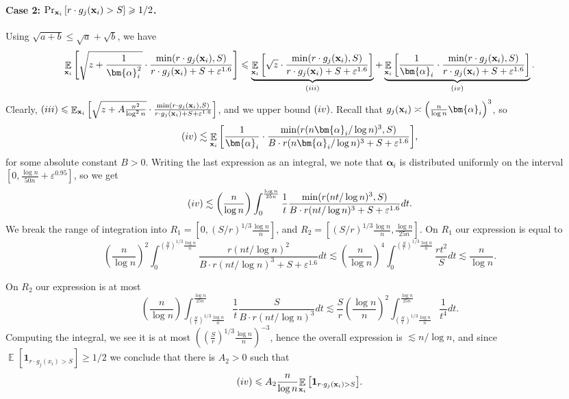 \documentclass[10pt,a4paper]{article}
\newcommand{\mathbbm}[1]{\mathbf{#1}}
\newcommand\Prob[2]{{\Pr_{#1}\left[ {#2} \right]}}
\newcommand\Expect[2]{{\mathop{\mathbb{E}}_{#1}\left[ {#2} \right]}}
\newcommand\eps{\varepsilon}
\renewcommand\geq{\geqslant}
\renewcommand\leq{\leqslant}
\newcommand{\rom}[1]{\uppercase\expandafter{\romannumeral #1\relax}}
\newcommand{\al}{\alpha}
\newcommand{\ve}{\varepsilon}
\def\ll{\lesssim}
\def\ee{\asymp}
\begin{document}
    \paragraph{Case 2: $\Prob{{\bf x}_i}{r\cdot g_j({\bf x}_i)>S} \geq 1/2$.}
    Using $\sqrt{a+b}\leq \sqrt{a}+\sqrt{b}$, we have
    \[
    \Expect{{\bf x}_i}{\sqrt{z+\frac{1}{\bm{\al}_i^2}} \cdot\frac{\min(r\cdot g_j({\bf x}_i),S)}
	{r\cdot g_j({\bf x}_i)+S+\ve^{1.6}}}
    \leq
    \underbrace{\Expect{{\bf x}_i}{\sqrt{z} \cdot\frac{\min(r\cdot g_j({\bf x}_i),S)}
	{r\cdot g_j({\bf x}_i)+S+\ve^{1.6}}}}_{(\rom{3})}
    +\underbrace{\Expect{{\bf x}_i}{\frac{1}{\bm{\alpha}_i} \cdot\frac{\min(r\cdot g_j({\bf x}_i),S)}
	{r\cdot g_j({\bf x}_i)+S+\ve^{1.6}}}}_{(\rom{4})}.
    \]
    Clearly,
    $(\rom{3})\leq \Expect{{\bf x}_i}{\sqrt{z+A\frac{n^2}{\log^2 n}} \cdot \frac{\min(r\cdot g_j({\bf x}_i),S)}{r\cdot g_j({\bf x}_i)+S+\ve^{1.6}}}$,
    and we upper bound $(\rom{4})$. Recall that $g_j({\bf x}_i) \ee \left(\frac{n}{\log n} \bm{\alpha}_i\right)^3$, so
    \[
    (\rom{4})
    \ll \Expect{{\bf x}_i}{\frac{1}{\bm{\alpha}_i} \cdot
    \frac{\min(r(n\bm{\alpha}_i/\log n)^3,S)}{B\cdot r (n\bm{\al}_i/\log n)^3+S+\ve^{1.6}}},
    \]
    for some absolute constant $B>0$. Writing the last expression as an integral, we note
    that $\bm{\alpha}_i$ is distributed uniformly on the interval $[0,\frac{\log n}{50n}+\eps^{0.95}]$, so
    we get
    \[
    (\rom{4})\ll\left(\frac{n}{\log n}\right)\int_{0}^{\frac{\log n}{25 n}}\frac{1}{t}\frac{\min(r(n t/\log n)^3,S)}{B\cdot r (nt/\log n)^3+S+\ve^{1.6}} dt.
    \]
    We break the range of integration into $R_1 = \left[0, (S/r)^{1/3} \frac{\log n}{n}\right]$,
    and $R_2 = \left[(S/r)^{1/3} \frac{\log n}{n},\frac{\log n}{25 n}\right]$. On $R_1$ our expression is equal to
    \[
    \left(\frac{n}{\log n}\right)^2\int_{0}^{\left(\frac{S}{r}\right)^{1/3} \frac{\log n}{n}}\frac{r(n t/\log n)^2}{B\cdot r (nt/\log n)^3+S+\ve^{1.6}} dt
    \ll
    \left(\frac{n}{\log n}\right)^4\int_{0}^{\left(\frac{S}{r}\right)^{1/3} \frac{\log n}{n}}\frac{r t^2}{S} dt
    \ll \frac{n}{\log n}.
    \]
%
%
%
%
%
%
%

    On $R_2$ our expression is at most
    \[
    \left(\frac{n}{\log n}\right)\int_{\left(\frac{S}{r}\right)^{1/3} \frac{\log n}{n}}^{\frac{\log n}{25n}}
    \frac{1}{t}\frac{S}{B\cdot r (nt/\log n)^3} dt
    \ll\frac{S}{r}\left(\frac{\log n}{n}\right)^2\int_{\left(\frac{S}{r}\right)^{1/3} \frac{\log n}{n}}^{\frac{\log n}{25n}}
    \frac{1}{t^4} dt.
    \]
    Computing the integral, we see it is at most $(\left(\frac{S}{r}\right)^{1/3} \frac{\log n}{n})^{-3}$, hence
    the overall expression is $\ll n/\log n$, and since $\Expect{}{\mathbbm{1}_{r\cdot g_j(x_i)>S}}\geq 1/2$ we
    conclude that there is $A_2>0$ such that
    \[
    (\rom{4})\leq A_2 \frac{n}{\log n} \Expect{{\bf x}_i}{\mathbbm{1}_{r\cdot g_j({\bf x}_i)>S}}.
    \]
\end{document}
